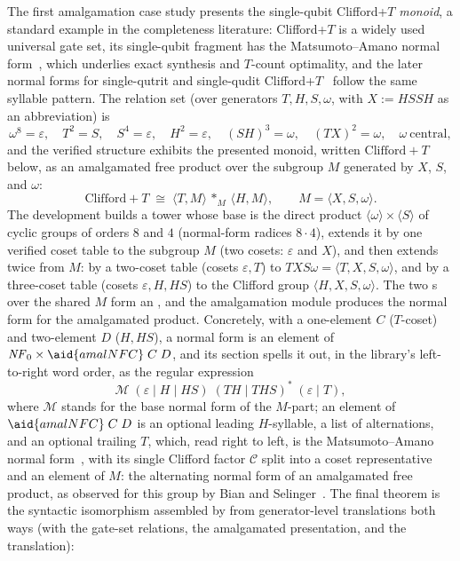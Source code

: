 The first amalgamation case study presents the single-qubit Clifford+$T$
\emph{monoid}, a standard example in the completeness literature:
Clifford+$T$ is a widely used universal gate set, its single-qubit
fragment has the Matsumoto--Amano normal
form~\cite{matsumoto2008representation,giles2013remarks}, which underlies
exact synthesis and $T$-count optimality, and the later normal forms
for single-qutrit and single-qudit
Clifford+$T$~\cite{glaudell2019qutrit,prakash2018qutrit,jain2020qudit}
follow the same syllable pattern.  The relation set (over generators
$T, H, S, \omega$, with $X := H S S H$ as an abbreviation) is
\[
  \omega^8 = \varepsilon,\quad
  T^2 = S,\quad
  S^4 = \varepsilon,\quad
  H^2 = \varepsilon,\quad
  (SH)^3 = \omega,\quad
  (TX)^2 = \omega,\quad
  \omega\ \text{central},
\]
and the verified structure exhibits the presented monoid, written
$\mathrm{Clifford}{+}T$ below, as an
amalgamated free product over the subgroup $M$ generated by $X$, $S$, and
$\omega$:
\[
  \mathrm{Clifford}{+}T \;\cong\;
  \langle T, M \rangle \,\ast_{M}\, \langle H, M \rangle,
  \qquad M = \langle X, S, \omega \rangle .
\]
The development builds a tower whose base is the direct product
$\langle \omega \rangle \times \langle S \rangle$ of cyclic groups of
orders $8$ and $4$ (normal-form radices $8 \cdot 4$), extends it by one
verified coset table to the subgroup $M$ (two cosets:
$\varepsilon$ and $X$), and then extends twice from $M$:
by a two-coset table (cosets $\varepsilon, T$) to
$\mathit{TXS\omega} = \langle T, X, S, \omega \rangle$, and by a
three-coset table (cosets $\varepsilon, H, HS$) to the Clifford group
$\langle H, X, S, \omega \rangle$.  The two s over
the shared $M$ form an , and the
amalgamation module produces the normal form for the amalgamated
product.  Concretely, with a one-element $C$ ($T$-coset) and two-element $D$
($H, HS$), a normal form is an element of $\mathit{NF}_0 \times
\aid{amalNFC}\;C\;D$, and its section spells it out, in the library's
left-to-right word order, as the regular expression
\[
  \mathcal{M}\;(\varepsilon \mid H \mid HS)\;(TH \mid THS)^{*}\;(\varepsilon \mid T),
\]
where $\mathcal{M}$ stands for the base normal form of the $M$-part; an
element of $\aid{amalNFC}\;C\;D$ is an optional leading
$H$-syllable, a list of alternations, and an optional trailing $T$,
which, read right to left, is the Matsumoto--Amano normal
form~\cite{matsumoto2008representation,giles2013remarks},
with its single Clifford factor $\mathcal{C}$ split into a coset
representative and an element of $M$:
the alternating normal form of an amalgamated free product, as observed
for this group by Bian and Selinger~\cite{bian2023cliffordcs3}.  The
final theorem is the
syntactic isomorphism assembled by  from
generator-level translations both ways (with \aid{{\_}==={\_}} the
gate-set relations,  the amalgamated presentation, and
 the translation):

